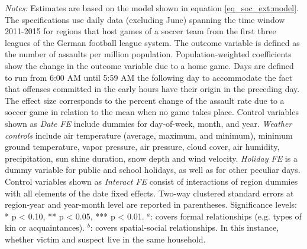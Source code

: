 \documentclass[11pt, a4paper]{article} %
\begin{document}
\begin{landscape}
\begin{table}[H]
\begin{threeparttable}
\begin{tablenotes}
				\item \scriptsize \emph{Notes:} Estimates are based on the model shown in equation \ref{eq_soc_ext:model}. The specifications use daily data (excluding June) spanning the time window 2011-2015 for regions that host games of a soccer team from the first three leagues of the German football league system. The outcome variable is defined as the number of assaults per million population. Population-weighted coefficients show the change in the outcome variable due to a home game. Days are defined to run from 6:00 AM until 5:59 AM the following day to accommodate the fact that offenses committed in the early hours have their origin in the preceding day. The effect size corresponds to the percent change of the assault rate due to a soccer game in relation to the mean when no game takes place. Control variables shown as \textit{Date FE} include dummies for day-of-week, month, and year. \textit{Weather controls} include air temperature (average, maximum, and minimum), minimum ground temperature, vapor pressure, air pressure, cloud cover, air humidity, precipitation, sun shine duration, snow depth and wind velocity. \textit{Holiday FE} is a dummy variable for public and school holidays, as well as for other peculiar days. Control variables shown as \textit{Interact FE} consist of interactions of region dummies with all elements of the date fixed effects. Two-way clustered standard errors at region-year and year-month level are reported in parentheses. \newline Significance levels: * p < 0.10, ** p < 0.05, *** p < 0.01.\newline \hspace*{15pt} $^a$: covers formal relationships (e.g. types of kin or acquaintances). \newline \hspace*{15pt} $^b$: covers spatial-social relationships. In this instance, whether victim and suspect live in the same household.
			\end{tablenotes} 
		\end{threeparttable} 
	\end{table}
	\vspace*{\fill}\clearpage 
\end{landscape}
\end{document}
